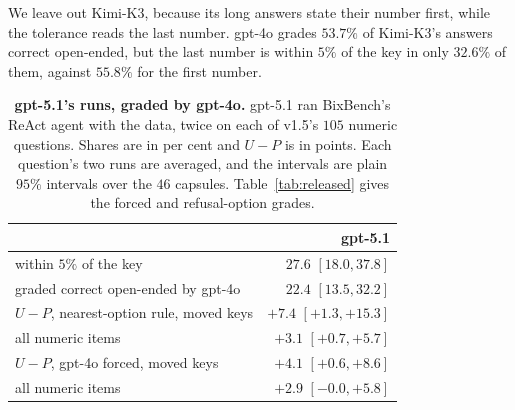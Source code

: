 \documentclass{article}
\begin{document}
We leave out Kimi-K3, because its long answers state their number first, while the tolerance reads the last number.
gpt-4o grades $53.7\%$ of Kimi-K3's answers correct open-ended, but the last number is within $5\%$ of the key in only
$32.6\%$ of them, against $55.8\%$ for the first number.

\begin{table}[htbp]
\centering\footnotesize\setlength{\tabcolsep}{4pt}
\caption{\textbf{gpt-5.1's runs, graded by gpt-4o.} gpt-5.1 ran BixBench's ReAct agent with the data, twice on
each of v1.5's $105$ numeric questions. Shares are in per cent and $U-P$ is in points. Each question's two runs are
averaged, and the intervals are plain $95\%$ intervals over the $46$ capsules. Table~\ref{tab:released} gives the
forced and refusal-option grades.}
\label{tab:strong}
\begin{tabular}{lr}
\toprule
& gpt-5.1\\
\midrule
within $5\%$ of the key & $27.6$ $[18.0,37.8]$\\
graded correct open-ended by gpt-4o & $22.4$ $[13.5,32.2]$\\
$U-P$, nearest-option rule, moved keys & $+7.4$ $[+1.3,+15.3]$\\
\quad all numeric items & $+3.1$ $[+0.7,+5.7]$\\
$U-P$, gpt-4o forced, moved keys & $+4.1$ $[+0.6,+8.6]$\\
\quad all numeric items & $+2.9$ $[-0.0,+5.8]$\\
\bottomrule
\end{tabular}
\end{table}
\end{document}
